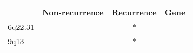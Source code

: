 \begin{tabular}{lccr}
\toprule
{} & Non-recurrence & Recurrence & Gene \\
\midrule
6q22.31 &                &          * &      \\
9q13    &                &          * &      \\
\bottomrule
\end{tabular}
